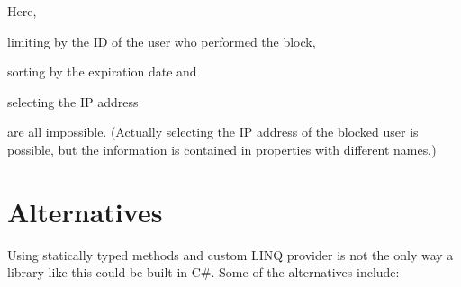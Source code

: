 Here,
\begin{compactitem}
\item limiting by the ID of the user who performed the block,
\item sorting by the expiration date and
\item selecting the \ac{IP} address
\end{compactitem}
are all impossible.
(Actually selecting the \ac{IP} address of the blocked user is possible,
but the information is contained in properties with different names.)

\section{Alternatives}

Using statically typed methods and custom LINQ provider is not the only way a library like this
could be built in C\#.
Some of the alternatives include:

